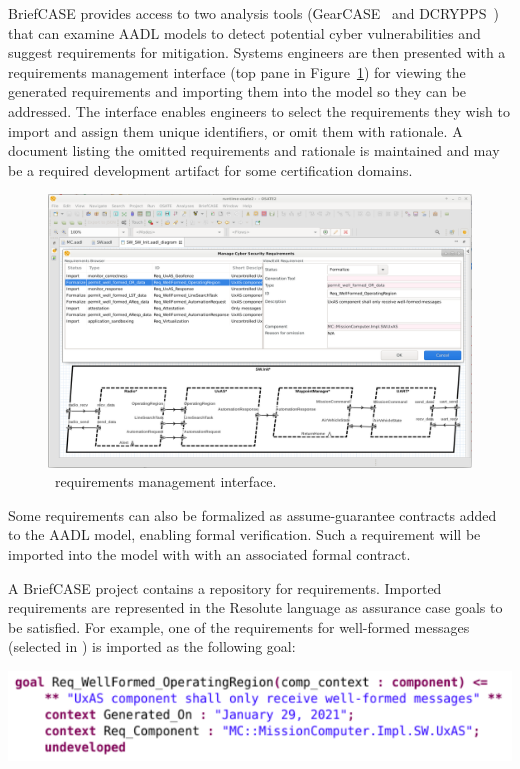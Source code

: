 BriefCASE provides access to two analysis tools (GearCASE~\cite{gearcase2020} and
DCRYPPS~\cite{dcrypps2019}) that can examine AADL models to detect potential cyber vulnerabilities
and suggest requirements for mitigation.
%
Systems engineers are then presented with a requirements management interface
(top pane in Figure~\ref{fig:req-mgmt}) for viewing the generated requirements and importing them into the model
so they can be addressed. The interface enables engineers to select the requirements they wish to
import and assign them unique identifiers, or omit them with rationale. A document listing the omitted
requirements and rationale is maintained and may be a required development artifact for some
certification domains. 

\begin{figure}[h]
	\centering
	\includegraphics[width=\textwidth]{figs/req-mgmt.png}
	\caption{\briefcase \ requirements management interface.} 
	\label{fig:req-mgmt} 
\end{figure}

Some requirements can also be formalized as assume-guarantee contracts
added to the AADL model, enabling formal verification. 
Such a requirement will be imported into the model with with an associated formal
contract.

A BriefCASE project contains a repository for requirements. Imported requirements are represented in the Resolute language as assurance case goals to be satisfied. For example, one of the requirements for well-formed messages (selected in ) is imported as the following goal:

\noindent
\includegraphics[width=1\columnwidth]{figs/req-wellformed-or.png}

